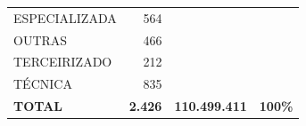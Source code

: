 \documentclass{article}
\begin{document}
\begin{longtable}[c]{m{7cm}|m{2.5cm}|m{2.5cm}|m{2.5cm}}
\multicolumn{1}{L{7cm}|}{ \hspace{3em} ESPECIALIZADA} & \multicolumn{1}{r|}{ 564} &  & \\
\multicolumn{1}{L{7cm}|}{ \hspace{3em} OUTRAS} & \multicolumn{1}{r|}{ 466} &  & \\
\multicolumn{1}{L{7cm}|}{ \hspace{3em} TERCEIRIZADO} & \multicolumn{1}{r|}{ 212} &  & \\
\multicolumn{1}{L{7cm}|}{ \hspace{3em} TÉCNICA} & \multicolumn{1}{r|}{ 835} &  & \\
\hline \hline 
\multicolumn{1}{L{7cm}|}{ \textbf{TOTAL}} & \multicolumn{1}{r|}{ \textbf{2.426}} & \multicolumn{1}{r|}{ \textbf{110.499.411}} & \multicolumn{1}{r}{ \textbf{100\%}} \\
\end{longtable}
\newpage
\small
\end{document}
